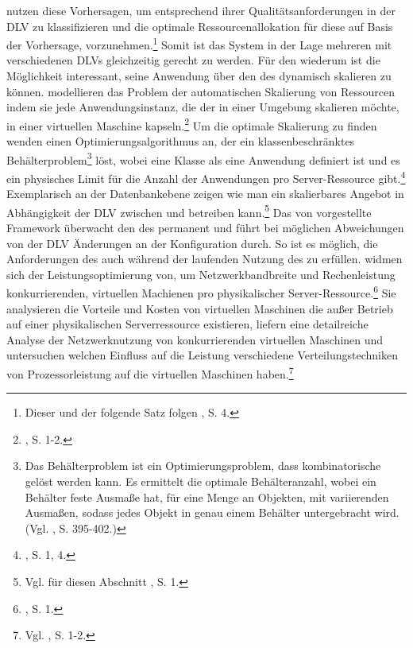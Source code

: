 \cite{Brandt.2012} nutzen diese Vorhersagen, um \CSU entsprechend ihrer Qualitätsanforderungen in der DLV zu klassifizieren und die optimale Ressourcenallokation für diese \CSUComma auf Basis der Vorhersage, vorzunehmen.\footnote{Dieser und der folgende Satz folgen \cite{Brandt.2012}, S. 4.}
Somit ist das System in der Lage mehreren \CSUn mit verschiedenen \acs{DLV}s gleichzeitig gerecht zu werden.
\newline
Für den \CSU wiederum ist die Möglichkeit interessant, seine Anwendung über den \CS des \CSPs dynamisch skalieren zu können. 
\cite{Xiao.2012} modellieren das Problem der automatischen Skalierung von Ressourcen indem sie jede Anwendungsinstanz, die der \CSU in einer \CC Umgebung skalieren möchte, in einer virtuellen Maschine kapseln.\footnote{\cite{Xiao.2012}, S. 1-2.}
Um die optimale Skalierung zu finden wenden \cite{Xiao.2012} einen Optimierungsalgorithmus an, der ein klassenbeschränktes Behälterproblem\footnote{Das Behälterproblem ist ein Optimierungsproblem, dass kombinatorische gelöst werden kann. 
Es ermittelt die optimale Behälteranzahl, wobei ein Behälter feste Ausmaße hat, für eine Menge an  Objekten, mit variierenden Ausmaßen, sodass jedes Objekt in genau einem Behälter untergebracht wird. (Vgl. \cite{Voecking.2008}, S. 395-402.)} löst, wobei eine Klasse als eine Anwendung definiert ist und es ein physisches Limit für die Anzahl der Anwendungen pro Server-Ressource gibt.\footnote{\cite{Xiao.2012}, S. 1, 4.}
\newline
Exemplarisch an der Datenbankebene zeigen \cite{Zhao.2013} wie man ein skalierbares \CS Angebot in Abhängigkeit der \acs{DLV} zwischen \CSP und \CSU betreiben kann.\footnote{Vgl. für diesen Abschnitt \cite{Zhao.2013}, S. 1.}
Das von \cite{Zhao.2013} vorgestellte Framework überwacht den \CS des \CSPs permanent und führt bei möglichen Abweichungen von der \acs{DLV} Änderungen an der \CS Konfiguration durch. So ist es möglich, die Anforderungen des \CSUs auch während der laufenden Nutzung des \CSs zu erfüllen.
\newline
\cite{Mei.2013} widmen sich der Leistungsoptimierung von, um Netzwerkbandbreite und Rechenleistung konkurrierenden, virtuellen Machienen pro physikalischer Server-\linebreak Ressource.\footnote{\cite{Mei.2013}, S. 1.}
Sie analysieren die Vorteile und Kosten von virtuellen Maschinen die außer Betrieb auf einer physikalischen Serverressource existieren, liefern eine detailreiche Analyse der Netzwerknutzung von konkurrierenden virtuellen Maschinen und untersuchen welchen Einfluss auf die Leistung verschiedene Verteilungstechniken von Prozessorleistung auf die virtuellen Maschinen haben.\footnote{Vgl. \cite{Mei.2013}, S. 1-2.}
